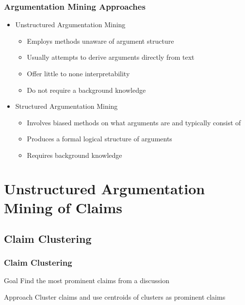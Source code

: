 \documentclass{beamer}
\begin{document}
\begin{frame}
\frametitle{Argumentation Mining Approaches}

\begin{itemize}
\item Unstructured Argumentation Mining
	\begin{itemize}
		\item Employs methods unaware of argument structure
		\item Usually attempts to derive arguments directly from text
		\item Offer little to none interpretability
		\item Do not require a background knowledge
	\end{itemize}
\item Structured Argumentation Mining
	\begin{itemize}
		\item Involves biased methods on what arguments are and typically consist of
		\item Produces a formal logical structure of arguments
		\item Requires background knowledge
	\end{itemize}
\end{itemize}

\end{frame}


\section{Unstructured Argumentation Mining of Claims}

\subsection{Claim Clustering}

\begin{frame}
	\frametitle{Claim Clustering}
	\begin{block}{Goal}
		Find the most prominent claims from a discussion
	\end{block}

	\begin{block}{Approach}
		Cluster claims and use centroids of clusters as prominent claims
	\end{block}
\end{frame}
\end{document}
